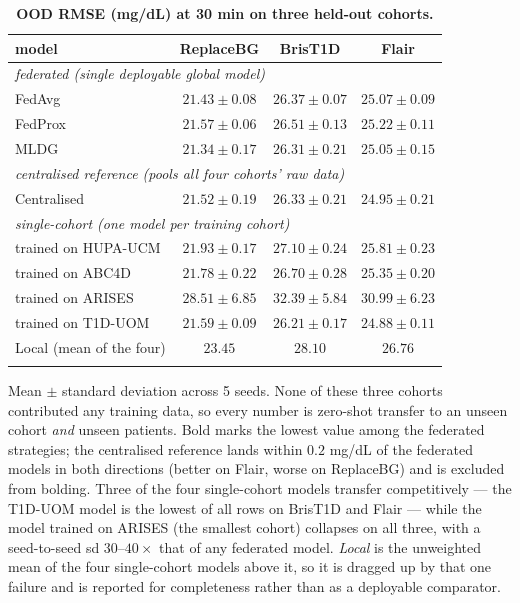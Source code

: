 \documentclass[10pt,letterpaper]{article}
\newlength\savedwidth
\newcommand\thickhline{\noalign{\global\savedwidth\arrayrulewidth\global\arrayrulewidth 2pt}%
\hline
\noalign{\global\arrayrulewidth\savedwidth}}
\begin{document}
\begin{table}[!ht]
\centering
\captionsetup{justification=centering,singlelinecheck=on}
\caption{\bf OOD RMSE (mg/dL) at 30 min on three held-out cohorts.}
\label{tab:ood}
\begin{tabular}{lccc}
\thickhline
model & ReplaceBG & BrisT1D & Flair \\
\hline
\multicolumn{4}{l}{\emph{federated (single deployable global model)}} \\
FedAvg  & $21.43 \pm 0.08$ & $26.37 \pm 0.07$ & $25.07 \pm 0.09$ \\
FedProx & $21.57 \pm 0.06$ & $26.51 \pm 0.13$ & $25.22 \pm 0.11$ \\
MLDG    & $\mathbf{21.34 \pm 0.17}$ & $\mathbf{26.31 \pm 0.21}$ & $\mathbf{25.05 \pm 0.15}$ \\
\hline
\multicolumn{4}{l}{\emph{centralised reference (pools all four cohorts' raw data)}} \\
Centralised & $21.52 \pm 0.19$ & $26.33 \pm 0.21$ & $24.95 \pm 0.21$ \\
\hline
\multicolumn{4}{l}{\emph{single-cohort (one model per training cohort)}} \\
\;trained on HUPA-UCM & $21.93 \pm 0.17$ & $27.10 \pm 0.24$ & $25.81 \pm 0.23$ \\
\;trained on ABC4D    & $21.78 \pm 0.22$ & $26.70 \pm 0.28$ & $25.35 \pm 0.20$ \\
\;trained on ARISES   & $28.51 \pm 6.85$ & $32.39 \pm 5.84$ & $30.99 \pm 6.23$ \\
\;trained on T1D-UOM  & $21.59 \pm 0.09$ & $26.21 \pm 0.17$ & $24.88 \pm 0.11$ \\
Local (mean of the four) & $23.45$ & $28.10$ & $26.76$ \\
\thickhline
\end{tabular}
\begin{center}
{\small Mean $\pm$ standard deviation across 5 seeds. None of these three cohorts
contributed any training data, so every number is zero-shot transfer to an unseen
cohort \emph{and} unseen patients. Bold marks the lowest value among the
federated strategies; the centralised reference lands within $0.2$ mg/dL of the
federated models in both directions (better on Flair, worse on ReplaceBG) and is
excluded from bolding. Three of the four single-cohort models transfer
competitively --- the T1D-UOM model is the lowest of all rows on BrisT1D and
Flair --- while the model trained on ARISES (the smallest cohort) collapses on
all three, with a seed-to-seed sd $30$--$40 \times$ that of any federated model.
\emph{Local} is the unweighted mean of the four single-cohort models above it,
so it is dragged up by that one failure and is reported for completeness rather
than as a deployable comparator.}
\end{center}
\end{table}
\end{document}
